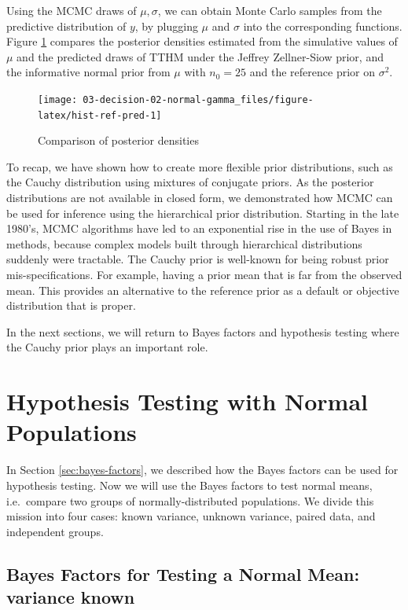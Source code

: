 \documentclass[]{book}
\theoremstyle{definition}
\theoremstyle{definition}
\theoremstyle{definition}
\theoremstyle{remark}
\begin{document}
Using the MCMC draws of \(\mu, \sigma\), we can obtain Monte Carlo
samples from the predictive distribution of \(y\), by plugging \(\mu\)
and \(\sigma\) into the corresponding functions. Figure
\ref{fig:hist-ref-pred} compares the posterior densities estimated from
the simulative values of \(\mu\) and the predicted draws of TTHM under
the Jeffrey Zellner-Siow prior, and the informative normal prior from
\(\mu\) with \(n_0 = 25\) and the reference prior on \(\sigma^2\).

\begin{figure}

{\centering \texttt{[image: 03-decision-02-normal-gamma\_files/figure-latex/hist-ref-pred-1]} 

}

\caption{Comparison of posterior densities}\label{fig:hist-ref-pred}
\end{figure}

To recap, we have shown how to create more flexible prior distributions,
such as the Cauchy distribution using mixtures of conjugate priors. As
the posterior distributions are not available in closed form, we
demonstrated how MCMC can be used for inference using the hierarchical
prior distribution. Starting in the late 1980's, MCMC algorithms have
led to an exponential rise in the use of Bayes in methods, because
complex models built through hierarchical distributions suddenly were
tractable. The Cauchy prior is well-known for being robust prior
mis-specifications. For example, having a prior mean that is far from
the observed mean. This provides an alternative to the reference prior
as a default or objective distribution that is proper.

In the next sections, we will return to Bayes factors and hypothesis
testing where the Cauchy prior plays an important role.

\section{Hypothesis Testing with Normal
Populations}\label{hypothesis-testing-with-normal-populations}

In Section \ref{sec:bayes-factors}, we described how the Bayes factors
can be used for hypothesis testing. Now we will use the Bayes factors to
test normal means, i.e.~compare two groups of normally-distributed
populations. We divide this mission into four cases: known variance,
unknown variance, paired data, and independent groups.

\subsection{Bayes Factors for Testing a Normal Mean: variance
known}\label{bayes-factors-for-testing-a-normal-mean-variance-known}
\end{document}
